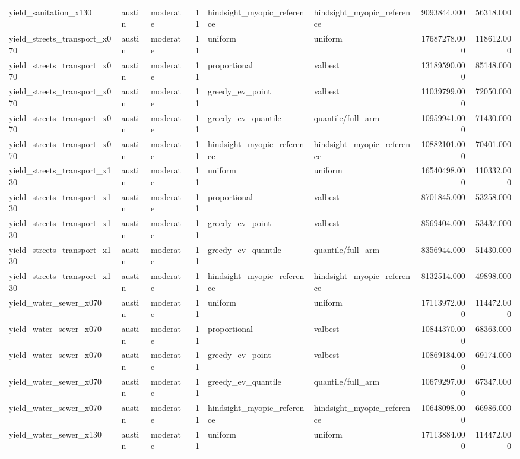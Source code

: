 \begin{tabular}{lllrllrr}
yield\_sanitation\_x130 & austin & moderate & 11 & hindsight\_myopic\_reference & hindsight\_myopic\_reference & 9093844.000 & 56318.000 \\
yield\_streets\_transport\_x070 & austin & moderate & 11 & uniform & uniform & 17687278.000 & 118612.000 \\
yield\_streets\_transport\_x070 & austin & moderate & 11 & proportional & valbest & 13189590.000 & 85148.000 \\
yield\_streets\_transport\_x070 & austin & moderate & 11 & greedy\_ev\_point & valbest & 11039799.000 & 72050.000 \\
yield\_streets\_transport\_x070 & austin & moderate & 11 & greedy\_ev\_quantile & quantile/full\_arm & 10959941.000 & 71430.000 \\
yield\_streets\_transport\_x070 & austin & moderate & 11 & hindsight\_myopic\_reference & hindsight\_myopic\_reference & 10882101.000 & 70401.000 \\
yield\_streets\_transport\_x130 & austin & moderate & 11 & uniform & uniform & 16540498.000 & 110332.000 \\
yield\_streets\_transport\_x130 & austin & moderate & 11 & proportional & valbest & 8701845.000 & 53258.000 \\
yield\_streets\_transport\_x130 & austin & moderate & 11 & greedy\_ev\_point & valbest & 8569404.000 & 53437.000 \\
yield\_streets\_transport\_x130 & austin & moderate & 11 & greedy\_ev\_quantile & quantile/full\_arm & 8356944.000 & 51430.000 \\
yield\_streets\_transport\_x130 & austin & moderate & 11 & hindsight\_myopic\_reference & hindsight\_myopic\_reference & 8132514.000 & 49898.000 \\
yield\_water\_sewer\_x070 & austin & moderate & 11 & uniform & uniform & 17113972.000 & 114472.000 \\
yield\_water\_sewer\_x070 & austin & moderate & 11 & proportional & valbest & 10844370.000 & 68363.000 \\
yield\_water\_sewer\_x070 & austin & moderate & 11 & greedy\_ev\_point & valbest & 10869184.000 & 69174.000 \\
yield\_water\_sewer\_x070 & austin & moderate & 11 & greedy\_ev\_quantile & quantile/full\_arm & 10679297.000 & 67347.000 \\
yield\_water\_sewer\_x070 & austin & moderate & 11 & hindsight\_myopic\_reference & hindsight\_myopic\_reference & 10648098.000 & 66986.000 \\
yield\_water\_sewer\_x130 & austin & moderate & 11 & uniform & uniform & 17113884.000 & 114472.000 \\

\end{tabular}
